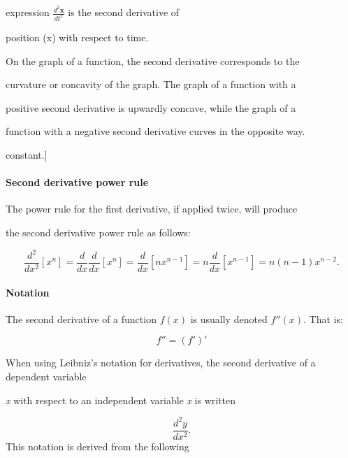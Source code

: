 expression $\tfrac{d^2\boldsymbol{x}}{dt^2}$ is the second derivative of

position (x) with respect to time.



On the graph of a function, the second derivative corresponds to the

curvature or concavity of the graph. The graph of a function with a

positive second derivative is upwardly concave, while the graph of a

function with a negative second derivative curves in the opposite way.




constant.]





\paragraph{Second derivative power rule}



The power rule for the first derivative, if applied twice, will produce

the second derivative power rule as follows:



$$\frac{d^2}{dx^2}\left[x^n\right] = \frac{d}{dx}\frac{d}{dx}\left[x^n\right] = \frac{d}{dx}\left[nx^{n-1}\right] = n\frac{d}{dx}\left[x^{n-1}\right] = n(n - 1)x^{n-2}.$$



\paragraph{Notation}



The second derivative of a function $f(x)$ is usually denoted $f''(x).$ That is:



$$f'' = \left(f'\right)'$$



When using Leibniz's notation for derivatives, the second derivative of a dependent variable

\textit{x} with respect to an independent variable \textit{x} is written



$$\frac{d^2y}{dx^2}.$$ This notation is derived from the following

